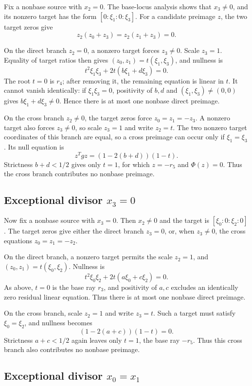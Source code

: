 Fix a nonbase source with \(x_2=0\). The base-locus analysis shows that
\(x_3\ne0\), and its nonzero target has the form
\([0:\xi_1:0:\xi_3]\). For a candidate preimage \(z\), the two target zeros
give
\[
z_2(z_0+z_3)=z_2(z_1+z_3)=0.
\]

On the direct branch \(z_2=0\), a nonzero target forces \(z_3\ne0\).
Scale \(z_3=1\). Equality of target ratios then gives
\((z_0,z_1)=t(\xi_1,\xi_3)\), and nullness is
\[
t^2\xi_1\xi_3+2t(b\xi_1+d\xi_3)=0.
\]
The root \(t=0\) is \(r_4\); after removing it, the remaining equation is
linear in \(t\). It cannot vanish identically: if
\(\xi_1\xi_3=0\), positivity of \(b,d\) and
\((\xi_1,\xi_3)\ne(0,0)\) gives
\(b\xi_1+d\xi_3\ne0\). Hence there is at most one nonbase direct preimage.

On the cross branch \(z_2\ne0\), the target zeros force
\(z_0=z_1=-z_3\). A nonzero target also forces \(z_3\ne0\), so scale
\(z_3=1\) and write \(z_2=t\). The two nonzero target coordinates of this
branch are equal, so a cross preimage can occur only if
\(\xi_1=\xi_3\). Its null equation is
\[
z^Tgz=(1-2(b+d))(1-t).
\]
Strictness \(b+d<1/2\) gives only \(t=1\), for which \(z=-r_5\) and
\(\Phi(z)=0\). Thus the cross branch contributes no nonbase preimage.

\subsection[Exceptional divisor x3=0]{Exceptional divisor \(x_3=0\)}

Now fix a nonbase source with \(x_3=0\). Then \(x_2\ne0\) and the target is
\([\xi_0:0:\xi_2:0]\). The target zeros give either the direct branch
\(z_3=0\), or, when \(z_3\ne0\), the cross equations
\(z_0=z_1=-z_2\).

On the direct branch, a nonzero target permits the scale \(z_2=1\), and
\((z_0,z_1)=t(\xi_0,\xi_2)\). Nullness is
\[
t^2\xi_0\xi_2+2t(a\xi_0+c\xi_2)=0.
\]
As above, \(t=0\) is the base ray \(r_3\), and positivity of \(a,c\) excludes
an identically zero residual linear equation. Thus there is at most one
nonbase direct preimage.

On the cross branch, scale \(z_2=1\) and write \(z_3=t\). Such a target must
satisfy \(\xi_0=\xi_2\), and nullness becomes
\[
(1-2(a+c))(1-t)=0.
\]
Strictness \(a+c<1/2\) again leaves only \(t=1\), the base ray \(-r_5\).
Thus this cross branch also contributes no nonbase preimage.

\subsection[Exceptional divisor x0=x1]{Exceptional divisor \(x_0=x_1\)}

